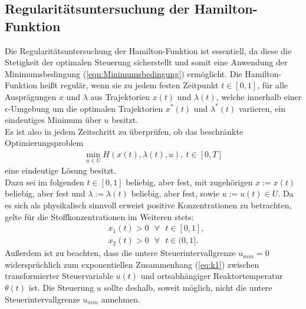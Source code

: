 \subsection{Regularitätsuntersuchung der Hamilton-Funktion}
Die Regularitätsuntersuchung der Hamilton-Funktion ist essentiell, da diese die Stetigkeit der optimalen Steuerung sicherstellt und somit eine Anwendung der Minimumsbedingung (\ref{eqn:Minimumsbedingung}) ermöglicht. Die Hamilton-Funktion heißt regulär, wenn sie zu jedem festen Zeitpunkt $t\in [0,1]$, für alle Ausprägungen $x$ und $\lambda$ aus Trajektorien $x(t)$ und $\lambda(t)$, welche innerhalb einer $\epsilon$-Umgebung um die optimalen Trajektorien $x^*(t)$ und $\lambda^*(t)$ variieren, ein eindeutiges Minimum über $u$ besitzt. \\
Es ist also in jedem Zeitschritt zu überprüfen, ob das beschränkte Optimierungsproblem
\begin{align}
	\min\limits_{u \in U} H(x(t),\lambda(t),u), \: t \in [0,T] \label{eq:min_regularität}
\end{align}
eine eindeutige Lösung besitzt. \\
Dazu sei im folgenden $t \in [0,1]$ beliebig, aber fest, mit zugehörigen $x := x(t)$ beliebig, aber fest und $\lambda := \lambda(t)$ beliebig, aber fest, sowie $u := u(t) \in U$. 
Da es sich als physikalisch sinnvoll erweist positive Konzentrationen zu betrachten, gelte für die Stoffkonzentrationen im Weiteren stets:
\begin{align}
	& x_1(t) > 0 \text{ } \forall \text{ } t \in [0,1], \nonumber \\
	& x_2(t) > 0 \text{ } \forall \text{ } t \in (0,1]. \label{eq:annahme_x_pos}
\end{align}
Außerdem ist zu beachten, dass die untere Steuerintervallgrenze $u_{min} = 0$ widersprüchlich zum exponentiellen Zusammenhang (\ref{eq:k1}) zwischen transformierter Steuervariable $u(t)$ und ortsabhängiger Reaktortemperatur $\theta(t)$ ist. Die Steuerung $u$ sollte deshalb, soweit möglich, nicht die untere Steuerintervallgrenze $u_{min}$ annehmen. \\
